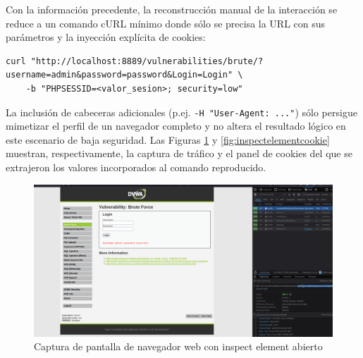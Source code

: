 \documentclass[letterpaper,12pt]{article}
\begin{document}
Con la información precedente, la reconstrucción manual de la interacción se reduce a un comando cURL mínimo donde sólo se precisa la URL con sus parámetros y la inyección explícita de cookies:
\begin{verbatim}
curl "http://localhost:8889/vulnerabilities/brute/?username=admin&password=password&Login=Login" \
    -b "PHPSESSID=<valor_sesion>; security=low"
\end{verbatim}
La inclusión de cabeceras adicionales (p.ej. \texttt{-H "User-Agent: ..."}) sólo persigue mimetizar el perfil de un navegador completo y no altera el resultado lógico en este escenario de baja seguridad. Las Figuras \ref{fig:inspectelement} y \ref{fig:inspectelementcookie} muestran, respectivamente, la captura de tráfico y el panel de cookies del que se extrajeron los valores incorporados al comando reproducido.
\begin{figure}
    \centering
    \includegraphics[width=1\linewidth]{curl/Captura desde 2025-10-01 23-42-53.png}
    \caption{Captura de pantalla de navegador web con inspect element abierto}
    \label{fig:inspectelement}
\end{figure}
\end{document}
